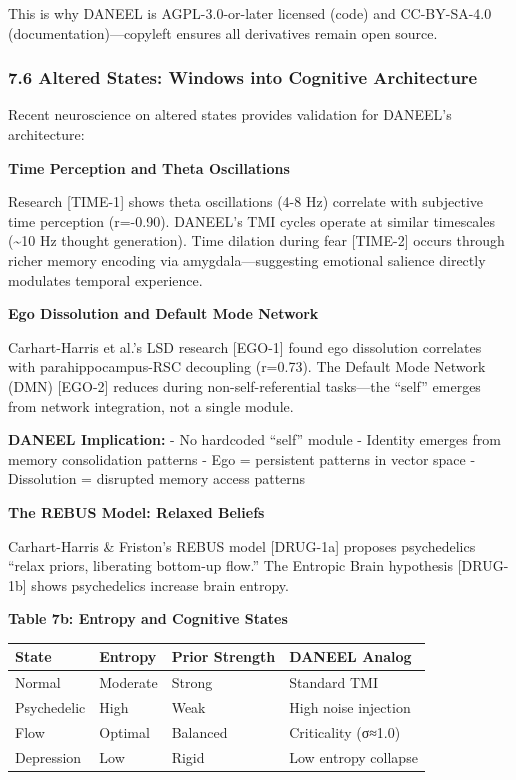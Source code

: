 \documentclass[
  11pt,
]{article}
\newcounter{none} %
\begin{document}
This is why DANEEL is AGPL-3.0-or-later licensed (code) and CC-BY-SA-4.0
(documentation)---copyleft ensures all derivatives remain open source.

\subsubsection{7.6 Altered States: Windows into Cognitive
Architecture}\label{altered-states-windows-into-cognitive-architecture}

Recent neuroscience on altered states provides validation for DANEEL's
architecture:

\textbf{Time Perception and Theta Oscillations}

Research {[}TIME-1{]} shows theta oscillations (4-8 Hz) correlate with
subjective time perception (r=-0.90). DANEEL's TMI cycles operate at
similar timescales (\textasciitilde10 Hz thought generation). Time
dilation during fear {[}TIME-2{]} occurs through richer memory encoding
via amygdala---suggesting emotional salience directly modulates temporal
experience.

\textbf{Ego Dissolution and Default Mode Network}

Carhart-Harris et al.'s LSD research {[}EGO-1{]} found ego dissolution
correlates with parahippocampus-RSC decoupling (r=0.73). The Default
Mode Network (DMN) {[}EGO-2{]} reduces during non-self-referential
tasks---the ``self'' emerges from network integration, not a single
module.

\textbf{DANEEL Implication:} - No hardcoded ``self'' module - Identity
emerges from memory consolidation patterns - Ego = persistent patterns
in vector space - Dissolution = disrupted memory access patterns

\textbf{The REBUS Model: Relaxed Beliefs}

Carhart-Harris \& Friston's REBUS model {[}DRUG-1a{]} proposes
psychedelics ``relax priors, liberating bottom-up flow.'' The Entropic
Brain hypothesis {[}DRUG-1b{]} shows psychedelics increase brain
entropy.

\textbf{Table 7b: Entropy and Cognitive States}

{\def\LTcaptype{none} %
\begin{longtable}[]{@{}llll@{}}
\toprule\noalign{}
State & Entropy & Prior Strength & DANEEL Analog \\
\midrule\noalign{}
\endhead
\bottomrule\noalign{}
\endlastfoot
Normal & Moderate & Strong & Standard TMI \\
Psychedelic & High & Weak & High noise injection \\
Flow & Optimal & Balanced & Criticality (σ≈1.0) \\
Depression & Low & Rigid & Low entropy collapse \\
\end{longtable}
}
\end{document}
